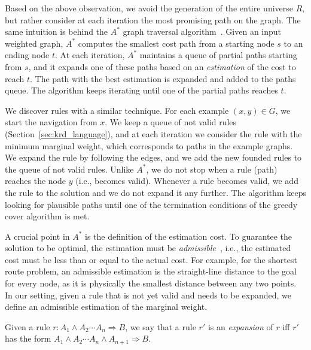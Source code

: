 Based on the above observation, we avoid the generation of the entire universe $R$, but rather consider at each iteration the most promising path on the graph. The same intuition  is behind 
the $A^*$ graph traversal algorithm~\cite{hart1968formal}. 
Given an input weighted graph, $A^*$ computes the smallest cost path from a starting node $s$ to an ending node $t$. At each iteration, $A^*$ maintains a queue of partial paths starting from $s$, and it expands one of these paths based on an \emph{estimation} of the cost to reach $t$. The path with the best estimation is expanded and added to the paths queue. The algorithm keeps iterating until one of the partial paths reaches $t$. 

We discover rules with a similar technique. For each example $(x,y) \in G$, we start the navigation from $x$. We keep a queue of not valid rules (Section~\ref{sec:krd_language}), 
and at each iteration we consider the rule with the minimum marginal weight, which corresponds to paths in the example graphs. 
We expand the rule by following the edges, and we add the new founded rules to the queue of not valid rules. Unlike $A^*$, we do not stop when a rule (path) reaches the node $y$ (i.e., becomes valid). Whenever a rule becomes valid, we add the rule to the solution and we do not expand it any further. The algorithm keeps looking for plausible paths until one of the termination conditions of the greedy cover algorithm is met. %

A crucial point in $A^*$ is the definition of the estimation cost. To guarantee the solution to be optimal, the estimation must be \emph{admissible}~\cite{hart1968formal}, i.e., the estimated cost must be less than or equal to the actual cost. 
For example, for the shortest route problem, an admissible estimation is the straight-line distance to the goal for every node, as it is physically the smallest distance between any two points. In our setting, given a rule that is not yet valid and needs to be expanded, we define an admissible estimation of the marginal weight.

\begin{definition}
	Given a rule $r : A_1 \wedge A_2 \cdots A_n \Rightarrow B$, we say that a rule $r'$ is an \emph{expansion} of $r$ iff $r'$ has the form $A_1 \wedge A_2 \cdots A_n \wedge A_{n+1} \Rightarrow B$. %
\end{definition}

